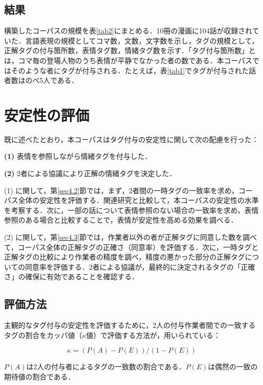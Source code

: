 \documentclass[japanese]{jnlp_1.3c}
\begin{document}
\subsection{結果}

構築したコーパスの規模を表\ref{tab2}にまとめる．10冊の漫画に104話が収録されていた．言語表現の規模としてコマ数，文数，文字数を示し，タグの規模として，正解タグの付与箇所数，表情タグ数，情緒タグ数を示す．「タグ付与箇所数」とは，コマ毎の登場人物のうち表情が平静でなかった者の数である．本コーパスではそのような者にタグが付与される．たとえば，表\ref{tab1}でタグが付与された話者数はのべ5人である．

\section{安定性の評価}

既に述べたとおり，本コーパスはタグ付与の安定性に関して次の配慮を行った：
\begin{description}
\item {\bf (1)} 表情を参照しながら情緒タグを付与した．
\item {\bf (2)} 2者による協議により正解の情緒タグを決定した．
\end{description}

(1) に関して，第\ref{sec4.2}節では，まず，2者間の一時タグの一致率を求め，コーパス全体の安定性を評価する．関連研究と比較して，本コーパスの安定性の水準を考察する．次に，一部の話について表情参照のない場合の一致率を求め，表情参照のある場合と比較することで，表情が安定性を高める効果を調べる．

(2) に関して，第\ref{sec4.3}節では，作業者以外の者が正解タグに同意した数を調べて，コーパス全体の正解タグの正確さ（同意率）を評価する．次に，一時タグと正解タグの比較により作業者の精度を調べ，精度の悪かった部分の正解タグについての同意率を評価する．2者による協議が，最終的に決定されるタグの「正確さ」の確保に有効であることを確認する．

\subsection{評価方法}

主観的なタグ付与の安定性を評価するために，2人の付与作業者間での一致するタグの割合をカッパ値（$\kappa$値）で評価する方法が，用いられている\cite{Narayanan02}：

\[ \kappa = (P(A) - P(E)) / (1 - P(E)) \]

$P(A)$は2人の付与者によるタグの一致数の割合である．$P(E)$は偶然の一致の期待値の割合である．
\end{document}
